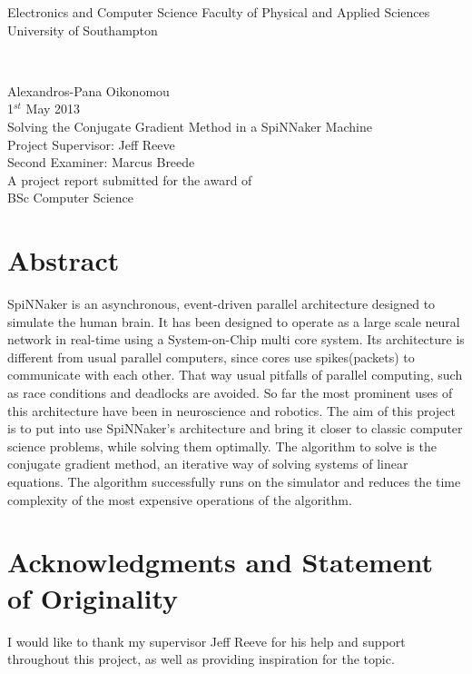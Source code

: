 \documentclass[12pt,a4paper]{article}
\author{Alexandros-Panagiotis Oikonomou}
\begin{document}
\begin{titlepage}
\begin{center}
\begin{LARGE}
Electronics and Computer Science
Faculty of Physical and Applied Sciences
University of Southampton 
\end{LARGE}
\\[2cm]
\begin{large}
Alexandros-Pana Oikonomou
\\
1$^{st}$ May 2013
\\[2cm]
Solving the Conjugate Gradient Method in a SpiNNaker Machine
\\[3.5cm]
Project Supervisor: Jeff Reeve
\\Second Examiner: Marcus Breede
\\[3.5cm]
A project report submitted for the award of
\\BSc Computer Science
\end{large}
\end{center}
\end{titlepage}
\section*{Abstract}
SpiNNaker is an asynchronous, event-driven parallel architecture designed to simulate
the human brain. It has been designed to operate as a large scale neural network in
real-time using a System-on-Chip multi core system. Its architecture is different from
usual parallel computers, since cores use spikes(packets) to communicate with each other. That
way usual pitfalls of parallel computing, such as race conditions and deadlocks are
avoided. So far the most prominent uses of this architecture have been in
neuroscience and robotics. The aim of this project is to put into use SpiNNaker's
architecture and bring it closer to classic computer science problems, while solving
them optimally. The algorithm to solve is the conjugate gradient
method, an iterative way of solving systems of linear equations. The algorithm successfully runs on the simulator and reduces the time complexity of the most expensive operations of the algorithm.
\newpage
\tableofcontents
\newpage
\section*{Acknowledgments and Statement of Originality}
I would like to thank my supervisor Jeff Reeve for his help and support throughout this project, as well as providing inspiration for the topic.
\newpage
\end{document}
